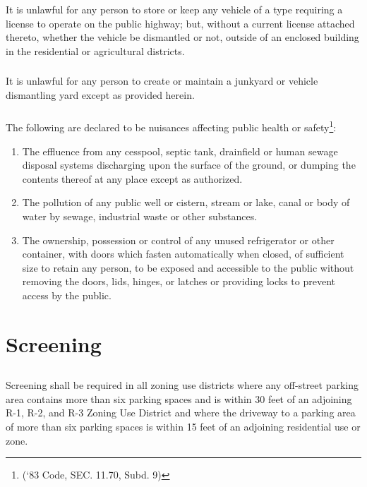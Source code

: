 \subsubsection{}
It is unlawful for any person to store or keep any vehicle of a type requiring a license to operate on the public highway; but, without a current license attached thereto, whether the vehicle be dismantled or not, outside of an enclosed building in the residential or agricultural districts.
\subsubsection{}
It is unlawful for any person to create or maintain a junkyard or vehicle dismantling yard except as provided herein.
\subsubsection{}
The following are declared to be nuisances affecting public health or safety\footnote{(‘83 Code, SEC. 11.70, Subd. 9)}:
\begin{enumerate}[{\indent}a)]
    \item The effluence from any cesspool, septic tank, drainfield or human sewage disposal systems discharging upon the surface of the ground, or dumping the contents thereof at any place except as authorized.
    \item The pollution of any public well or cistern, stream or lake, canal or body of water by sewage, industrial waste or other substances.
    \item The ownership, possession or control of any unused refrigerator or other container, with doors which fasten automatically when closed, of sufficient size to retain any person, to be exposed and accessible to the public without removing the doors, lids, hinges, or latches or providing locks to prevent access by the public.
\end{enumerate}
\section{Screening}
\subsection{}
Screening shall be required in all zoning use districts where any off-street parking area contains more than six parking spaces and is within 30 feet of an adjoining R-1, R-2, and R-3 Zoning Use District and where the driveway to a parking area of more than six parking spaces is within 15 feet of an adjoining residential use or zone.
